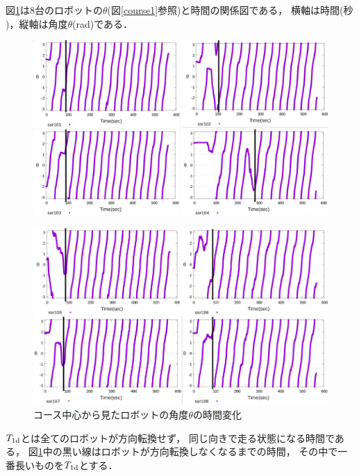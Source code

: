 図\ref{fig:ssr}は8台のロボットの$\theta$(図\ref{course1}参照)と時間の関係図である，
横軸は時間($秒$)，縦軸は角度$\theta$(rad)である．

\begin{figure}[!ht]
     \centering
     \includegraphics[width=1.0\linewidth]{ssr4_1.png}
\end{figure}

\vspace{-8mm}
\begin{figure}[!ht]\label{ssr2}
     \centering
     \includegraphics[width=1.0\linewidth]{ssr4_2.png}
     \caption{コース中心から見たロボットの角度$\theta$の時間変化}
     \label{fig:ssr}
\end{figure}


$T_{\rm 1d}$とは全てのロボットが方向転換せず，
同じ向きで走る状態になる時間である，
図\ref{fig:ssr}中の黒い線はロボットが方向転換しなくなるまでの時間，
その中で一番長いものを$T_{\rm 1d}$とする．




